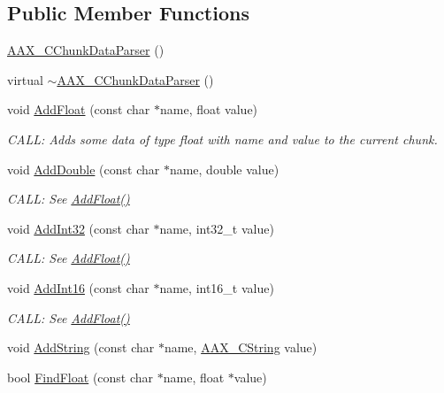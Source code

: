 \subsection*{Public Member Functions}
\begin{DoxyCompactItemize}
\item 
\mbox{\hyperlink{a01461_acf61d78b965c04e6af597379edad5a39}{A\+A\+X\+\_\+\+C\+Chunk\+Data\+Parser}} ()
\item 
virtual \mbox{\hyperlink{a01461_a4a31f21eaad9742482051f05f08fb72b}{$\sim$\+A\+A\+X\+\_\+\+C\+Chunk\+Data\+Parser}} ()
\item 
void \mbox{\hyperlink{a01461_aa85606ec7ad6e142abceb1097dcd2480}{Add\+Float}} (const char $\ast$name, float value)
\begin{DoxyCompactList}\small\item\em C\+A\+LL\+: Adds some data of type float with {\itshape name} and {\itshape value} to the current chunk. \end{DoxyCompactList}\item 
void \mbox{\hyperlink{a01461_a3dc9ec20551559ac3bdae8bf981ace8a}{Add\+Double}} (const char $\ast$name, double value)
\begin{DoxyCompactList}\small\item\em C\+A\+LL\+: See \mbox{\hyperlink{a01461_aa85606ec7ad6e142abceb1097dcd2480}{Add\+Float()}} \end{DoxyCompactList}\item 
void \mbox{\hyperlink{a01461_a6000b5c93362f3fe35d59d197f340306}{Add\+Int32}} (const char $\ast$name, int32\+\_\+t value)
\begin{DoxyCompactList}\small\item\em C\+A\+LL\+: See \mbox{\hyperlink{a01461_aa85606ec7ad6e142abceb1097dcd2480}{Add\+Float()}} \end{DoxyCompactList}\item 
void \mbox{\hyperlink{a01461_a06541319eb6f0628d33518b0485cd8cc}{Add\+Int16}} (const char $\ast$name, int16\+\_\+t value)
\begin{DoxyCompactList}\small\item\em C\+A\+LL\+: See \mbox{\hyperlink{a01461_aa85606ec7ad6e142abceb1097dcd2480}{Add\+Float()}} \end{DoxyCompactList}\item 
void \mbox{\hyperlink{a01461_a8a06f076c8e1c93df9348857abf50e39}{Add\+String}} (const char $\ast$name, \mbox{\hyperlink{a01573}{A\+A\+X\+\_\+\+C\+String}} value)
\item 
bool \mbox{\hyperlink{a01461_a0651792f378318532e5be3799b108e58}{Find\+Float}} (const char $\ast$name, float $\ast$value)

\end{DoxyCompactItemize}
